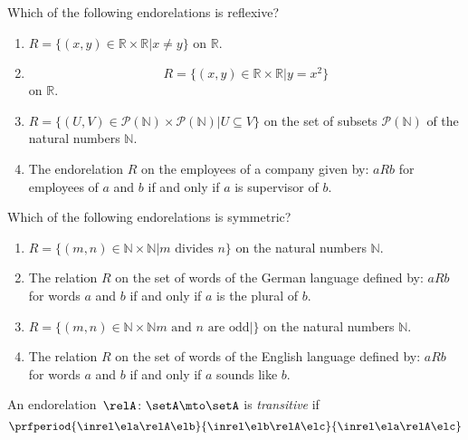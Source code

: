 \begin{quiz}
Which of the following endorelations is reflexive?
\begin{enumerate}[label=(\alph*)]
\item $R=\{(x,y)\in\mathbb{R}\times\mathbb{R}\vert x\neq y\}$ on $\mathbb{R}$.
\item $$R=\{(x,y)\in\mathbb{R}\times\mathbb{R}\vert y=x^{2}\}$$ on $\mathbb{R}$.
\item $R=\{(U,V)\in\mathcal{P}(\mathbb{N})\times\mathcal{P}(\mathbb{N})\vert U\subseteq V\}$ on the set of subsets $\mathcal{P}(\mathbb{N})$ of the natural numbers $\mathbb{N}$.
\item The endorelation $R$ on the employees of a company given by: $aRb$ for employees of $a$ and $b$ if and only if $a$ is supervisor of $b$.
\end{enumerate}
\end{quiz}

\begin{quiz}
Which of the following endorelations is symmetric?
\begin{enumerate}[label=(\alph*)]
\item $R=\{(m,n)\in\mathbb{N}\times\mathbb{N}\vert m\text{ divides }n\}$ on the natural numbers $\mathbb{N}$.
\item The relation $R$ on the set of words of the German language defined by: $aRb$ for words $a$ and $b$ if and only if $a$ is the plural of $b$.
\item $R=\{(m,n)\in\mathbb{N}\times\mathbb{N} m \text{ and } n \text{ are odd}\vert\}$ on the natural numbers $\mathbb{N}$.
\item The relation $R$ on the set of words of the English language defined by: $aRb$ for words $a$ and $b$ if and only if $a$ sounds like $b$. 
\end{enumerate}
\end{quiz}

\begin{ctdefinition}[Transitive]
    \label{def:transitive-relation}
    An endorelation~$\relA\colon \setA\mto \setA$ is \emph{transitive} if
    \begin{equation}\label{eq:transitive}
        \prfperiod{
            \inrel \ela \relA \elb
        }{
            \inrel \elb \relA \elc
        }{
            \inrel \ela \relA \elc
        }
    \end{equation}
\end{ctdefinition}

